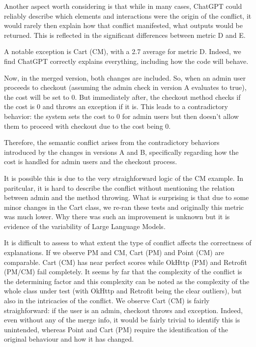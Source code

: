 Another aspect worth considering is that while in many cases, ChatGPT could reliably describe which elements and interactions were the origin of the conflict, it would rarely then explain how that conflict manifested,
what outputs would be returned. This is reflected in the significant differences between metric D and E.

A notable exception is Cart (CM), with a 2.7 average for metric D. Indeed, we find ChatGPT correctly explains everything, including how the code will behave.
\begin{response}
Now, in the merged version, both changes are included. So, when an admin user proceeds to checkout (assuming the admin check in version A evaluates to true), the cost will be set to 0. But immediately after, the checkout method checks if the cost is 0 and throws an exception if it is. This leads to a contradictory behavior: the system sets the cost to 0 for admin users but then doesn't allow them to proceed with checkout due to the cost being 0.

Therefore, the semantic conflict arises from the contradictory behaviors introduced by the changes in versions A and B, specifically regarding how the cost is handled for admin users and the checkout process.
\end{response}
It is possible this is due to the very straighforward logic of the CM example. In paritcular, it is hard to describe the conflict without mentioning the relation between admin and the method throwing.
What is surprising is that due to some minor changes in the Cart class, we re-ran these tests and originally this metric was much lower. Why there was such an improvement is unknown but it is evidence of the variability of Large Language Models.

It is difficult to assess to what extent the type of conflict affects the correctness of explanations. If we observe PM and CM, Cart (PM) and Point (CM) are comparable. Cart (CM) has near perfect scores while OkHttp (PM) and Retrofit (PM/CM) fail completely.
It seems by far that the complexity of the conflict is the determining factor and this complexity can be noted as the complexity of the whole class under test (with OkHttp and Retrofit being the clear outliers), but also in the intricacies of the conflict.
We observe Cart (CM) is fairly straighforward: if the user is an admin, checkout throws and exception. Indeed, even without any of the merge info, it would be fairly trivial to identify this is unintended, whereas
Point and Cart (PM) require the identification of the original behaviour and how it has changed.

